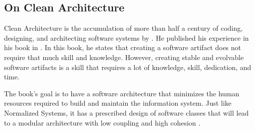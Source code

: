 \subsection{On Clean Architecture} \label{subsec:into_to_ca}

Clean Architecture is the accumulation of more than half a century of coding, designing,
and architecting software systems by \citeauthor*[]{martin_clean_2018}. He published his
experience in his book  in \citeyear[]{martin_clean_2018}.
In this book, he states that creating a software artifact does not require that much skill
and knowledge. However, creating stable and evolvable software artifacts is a skill that
requires a lot of knowledge, skill, dedication, and time.

The book's goal is to have a software architecture that minimizes the human resources
required to build and maintain the information system. Just like Normalized Systems, it
has a prescribed design of software classes that will lead to a modular architecture with
low coupling and high cohesion \parencite{martin_clean_2018}.